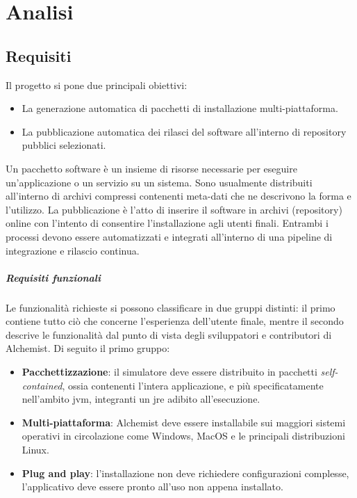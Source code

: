 
\chapter{Analisi}

\section{Requisiti}

Il progetto si pone due principali obiettivi:
\begin{itemize}
	\item La generazione automatica di pacchetti di installazione multi-piattaforma.
	\item La pubblicazione automatica dei rilasci del software all'interno di repository pubblici selezionati.
\end{itemize}
Un pacchetto software è un insieme di risorse necessarie per eseguire un'applicazione o un servizio su un sistema. Sono usualmente distribuiti all'interno di archivi compressi contenenti meta-dati che ne descrivono la forma e l'utilizzo. La pubblicazione è l'atto di inserire il software in archivi (repository) online con l'intento di consentire l'installazione agli utenti finali. Entrambi i processi devono essere automatizzati e integrati all'interno di una pipeline di integrazione e rilascio continua.

\paragraph{Requisiti funzionali}

Le funzionalità richieste si possono classificare in due gruppi distinti: il primo contiene tutto ciò che concerne l'esperienza dell'utente finale, mentre il secondo descrive le funzionalità dal punto di vista degli sviluppatori e contributori di Alchemist. Di seguito il primo gruppo:
\begin{itemize}
	\item \textbf{Pacchettizzazione}: il simulatore deve essere distribuito in pacchetti \textit{self-contained}, ossia contenenti l'intera applicazione, e più specificatamente nell'ambito \ac{jvm}, integranti un \ac{jre} adibito all'esecuzione.
	\item \textbf{Multi-piattaforma}: Alchemist deve essere installabile sui maggiori sistemi operativi in circolazione come Windows, MacOS e le principali distribuzioni Linux.
	\item \textbf{Plug and play}: l'installazione non deve richiedere configurazioni complesse, l'applicativo deve essere pronto all'uso non appena installato.
\end{itemize}

